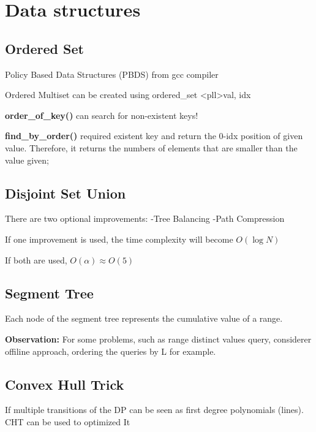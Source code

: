 \chapter{Data structures}

\section{Ordered Set}

    Policy Based Data Structures (PBDS) from gcc compiler

    Ordered Multiset can be created using ordered\_set \textless pll\textgreater {val, idx}

    \textbf{order\_of\_key()} can search for non-existent keys!
    
    \textbf{find\_by\_order()} required existent key and return the 0-idx position of given value.
    Therefore, it returns the numbers of elements that are smaller than the value given;


\section{Disjoint Set Union}

    There are two optional improvements:
        -Tree Balancing 
        -Path Compression

    If one improvement is used, 
    the time complexity will become $O(\log{N})$

    If both are used, $O(\alpha) \approx O(5)$


\section{Segment Tree}

    Each node of the segment tree represents the cumulative value of a range.

    \textbf{Observation:} For some problems, such as range distinct values query,
    considerer offiline approach, ordering the queries by L for example. 


\section{Convex Hull Trick}

    If multiple transitions of the DP can be seen as 
    first degree polynomials (lines). CHT can be used to optimized It

